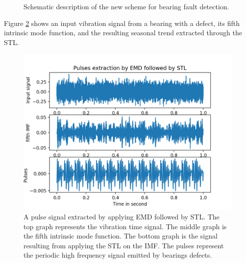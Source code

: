 \documentclass[../Main/thesis.tex]{subfiles}
\begin{document}
\begin{figure}[H]
  \caption{Schematic description of the new scheme for bearing fault detection.}
   \label{fig:pulse}
\end{figure}
   
\justify
Figure \ref{fig:emd-stl} shows an input vibration signal from a bearing with a defect, its fifth intrinsic mode function, and the resulting seasonal trend extracted through the STL.

\begin{figure}[H] %
   \centering
   \includegraphics[width=6in]{../fig/emd-stl.png} 
   \caption{ A pulse signal extracted by applying EMD followed by STL. The top graph represents the vibration time signal. The middle graph is the fifth intrinsic mode function. The bottom graph is the signal resulting from applying the STL on the IMF. The pulses represent the periodic high frequency signal emitted by bearings defects.}
   \label{fig:emd-stl}
\end{figure}
\justify
\end{document}
